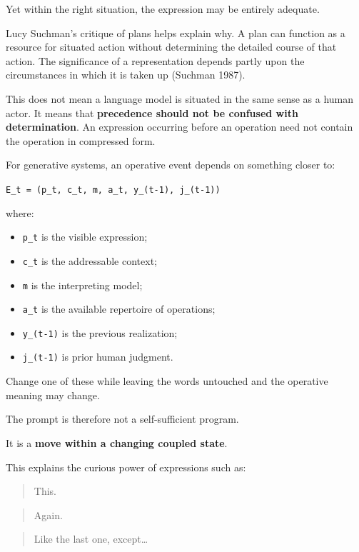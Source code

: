 \documentclass[
]{article}
\providecommand{\tightlist}{%
  \setlength{\itemsep}{0pt}\setlength{\parskip}{0pt}}
\begin{document}
Yet within the right situation, the expression may be entirely adequate.

Lucy Suchman's critique of plans helps explain why. A plan can function
as a resource for situated action without determining the detailed
course of that action. The significance of a representation depends
partly upon the circumstances in which it is taken up (Suchman 1987).

This does not mean a language model is situated in the same sense as a
human actor. It means that \textbf{precedence should not be confused
with determination}. An expression occurring before an operation need
not contain the operation in compressed form.

For generative systems, an operative event depends on something closer
to:

\texttt{E\_t\ =\ (p\_t,\ c\_t,\ m,\ a\_t,\ y\_(t-1),\ j\_(t-1))}

where:

\begin{itemize}
\tightlist
\item
  \texttt{p\_t} is the visible expression;
\item
  \texttt{c\_t} is the addressable context;
\item
  \texttt{m} is the interpreting model;
\item
  \texttt{a\_t} is the available repertoire of operations;
\item
  \texttt{y\_(t-1)} is the previous realization;
\item
  \texttt{j\_(t-1)} is prior human judgment.
\end{itemize}

Change one of these while leaving the words untouched and the operative
meaning may change.

The prompt is therefore not a self-sufficient program.

It is a \textbf{move within a changing coupled state}.

This explains the curious power of expressions such as:

\begin{quote}
This.
\end{quote}

\begin{quote}
Again.
\end{quote}

\begin{quote}
Like the last one, except\ldots{}
\end{quote}
\end{document}
